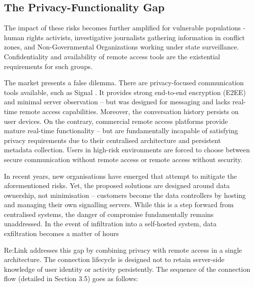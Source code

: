 \documentclass[12pt,a4paper]{article}
\begin{document}
\subsection{The Privacy-Functionality Gap}

The impact of these risks becomes further amplified for vulnerable populations - human rights activists, investigative journalists gathering information in conflict zones, and Non-Governmental Organizations working under state surveillance. Confidentiality and availability of remote access tools are the existential requirements for such groups.

The market presents a false dilemma. There are privacy-focused communication tools available, such as Signal \cite{signal}. It provides strong end-to-end encryption (E2EE) and minimal server observation – but was designed for messaging and lacks real-time remote access capabilities. Moreover, the conversation history persists on user devices. On the contrary, commercial remote access platforms provide mature real-time functionality – but are fundamentally incapable of satisfying privacy requirements due to their centralised architecture and persistent metadata collection. Users in high-risk environments are forced to choose between secure communication without remote access or remote access without security.

In recent years, new organisations have emerged that attempt to mitigate the aforementioned risks. Yet, the proposed solutions are designed around data ownership, not minimisation – customers become the data controllers by hosting and managing their own signalling servers. While this is a step forward from centralised systems, the danger of compromise fundamentally remains unaddressed. In the event of infiltration into a self-hosted system, data exfiltration becomes a matter of hours \cite{selfhostexfil}

Re:Link addresses this gap by combining privacy with remote access in a single architecture. The connection lifecycle is designed not to retain server-side knowledge of user identity or activity persistently. The sequence of the connection flow (detailed in Section 3.5) goes as follows:
\end{document}
